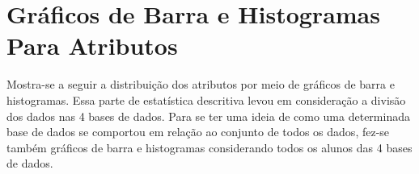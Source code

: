 \section{Gráficos de Barra e Histogramas Para Atributos} \label{graf_bar_hist}
Mostra-se a seguir a distribuição dos atributos por meio de gráficos de barra e
histogramas. Essa parte de estatística descritiva levou em consideração a divisão dos
dados nas 4 bases de dados. Para se ter uma ideia de como uma determinada base de
dados se comportou em relação ao conjunto de todos os dados, fez-se também gráficos
de barra e histogramas considerando todos os alunos das 4 bases de dados.  


